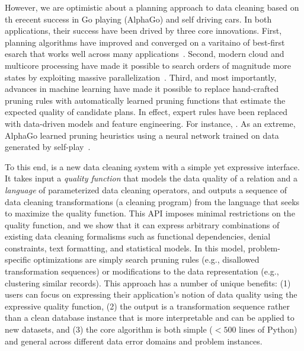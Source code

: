 However, we are optimistic about a planning approach to data cleaning based on th erecent success in Go playing (AlphaGo) and self driving cars.  In both applications, their success have been drived by three core innovations.  First, planning algorithms have improved and converged on a varitaino of best-first esarch that works well across many applications~\cite{}.  Second, modern cloud and multicore processing have made it possible to search orders of magnitude more states by exploiting massive parallelization~\cite{}.  Third, and most importantly, advances in machine learning have made it possible to replace hand-crafted pruning rules with automatically learned pruning functions that estimate the expected quality of candidate plans.  In effect, expert rules have been replaced with data-driven models and feature engineering.  For instance, .  As an extreme, AlphaGo learned pruning heuristics using a neural network trained on data generated by self-play~\cite{alphago}.   

To this end, \sys is a new data cleaning system with a simple yet expressive interface.  It takes input a {\it quality function} that models the data quality of a relation and a {\it language} of parameterized data cleaning operators, and outputs a sequence of data cleaning transformations (a cleaning program) from the language that seeks to maximize the quality function.  This API imposes minimal restrictions on the quality function, and we show that it can express arbitrary combinations of existing data cleaning formalisms such as functional dependencies, denial constraints, text formatting, and statistical models.  In this model, problem-specific optimizations are simply search pruning rules (e.g., disallowed transformation sequences) or modifications to the data representation (e.g., clustering similar records).  This approach has a number of unique benefits: (1) users can focus on expressing their application's notion of data quality using the expressive quality function, (2) the output is a transformation sequence rather than a clean database instance that is more interpretable and can be applied to new datasets, and (3) the core algorithm is both simple  ($<500$ lines of Python) and general across different data error domains and problem instances.

